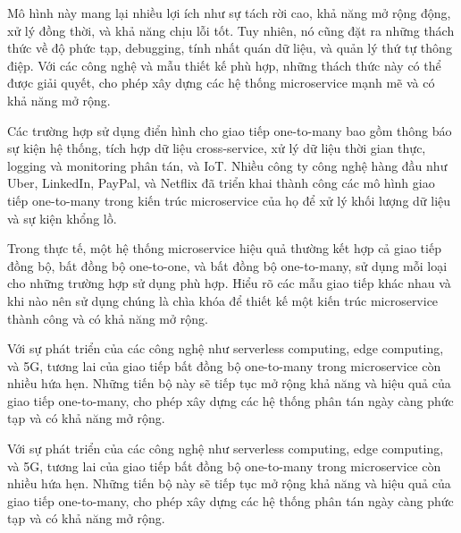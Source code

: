 Mô hình này mang lại nhiều lợi ích như sự tách rời cao, khả năng mở rộng động, xử lý đồng thời, và khả năng chịu lỗi tốt. Tuy nhiên, nó cũng đặt ra những thách thức về độ phức tạp, debugging, tính nhất quán dữ liệu, và quản lý thứ tự thông điệp. Với các công nghệ và mẫu thiết kế phù hợp, những thách thức này có thể được giải quyết, cho phép xây dựng các hệ thống microservice mạnh mẽ và có khả năng mở rộng.

Các trường hợp sử dụng điển hình cho giao tiếp one-to-many bao gồm thông báo sự kiện hệ thống, tích hợp dữ liệu cross-service, xử lý dữ liệu thời gian thực, logging và monitoring phân tán, và IoT. Nhiều công ty công nghệ hàng đầu như Uber, LinkedIn, PayPal, và Netflix đã triển khai thành công các mô hình giao tiếp one-to-many trong kiến trúc microservice của họ để xử lý khối lượng dữ liệu và sự kiện khổng lồ.

Trong thực tế, một hệ thống microservice hiệu quả thường kết hợp cả giao tiếp đồng bộ, bất đồng bộ one-to-one, và bất đồng bộ one-to-many, sử dụng mỗi loại cho những trường hợp sử dụng phù hợp. Hiểu rõ các mẫu giao tiếp khác nhau và khi nào nên sử dụng chúng là chìa khóa để thiết kế một kiến trúc microservice thành công và có khả năng mở rộng.

Với sự phát triển của các công nghệ như serverless computing, edge computing, và 5G, tương lai của giao tiếp bất đồng bộ one-to-many trong microservice còn nhiều hứa hẹn. Những tiến bộ này sẽ tiếp tục mở rộng khả năng và hiệu quả của giao tiếp one-to-many, cho phép xây dựng các hệ thống phân tán ngày càng phức tạp và có khả năng mở rộng.

Với sự phát triển của các công nghệ như serverless computing, edge computing, và 5G, tương lai của giao tiếp bất đồng bộ one-to-many trong microservice còn nhiều hứa hẹn. Những tiến bộ này sẽ tiếp tục mở rộng khả năng và hiệu quả của giao tiếp one-to-many, cho phép xây dựng các hệ thống phân tán ngày càng phức tạp và có khả năng mở rộng.